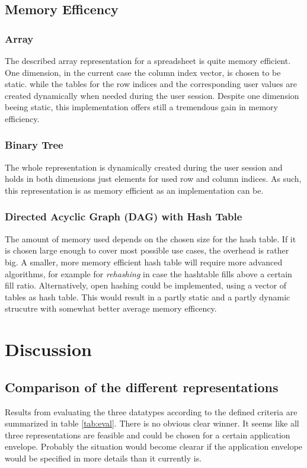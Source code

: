 \documentclass[a4paper,11pt,twoside]{article}
\begin{document}
\subsection{Memory Efficency}
\subsubsection{Array}
The described array representation for a spreadsheet is quite memory
efficient. One dimension, in the current case the column index vector,
is chosen to be static. while the tables for the row indices
and the corresponding user values are created dynamically when needed
during the user session. Despite one dimension beeing static, this
implementation offers still a tremendous gain in memory efficiency.  

\subsubsection{Binary Tree}
The whole representation is dynamically created during the user
session and holds in both dimensions just elements for used row and
column indices. As such, this representation is as memory efficient as
an implementation can be.


\subsubsection{Directed Acyclic Graph (DAG) with Hash Table}
The amount of memory used depends on the chosen size for the hash
table. If it is chosen large enough to cover most possible use cases,
the overhead is rather big. A smaller, more memory efficient hash
table will require more advanced algorithms, for example for \textit{rehashing}
in case the hashtable fills above a certain fill ratio. Alternatively,
open hashing could be implemented, using a vector of tables as hash
table. This would result in a partly static and a partly dynamic
strucutre with somewhat better average memory efficency.  


\section{Discussion}
\subsection{Comparison of the different representations}
Results from evaluating the three datatypes according to the defined
criteria are summarized in table \ref{tab:eval}. There is no obvious
clear winner. It seems like all three representations are feasible and
could be chosen for a certain application envelope. Probably the
situation would become clearar if the application envelope would be
specified in more details than it currently is.
\end{document}
